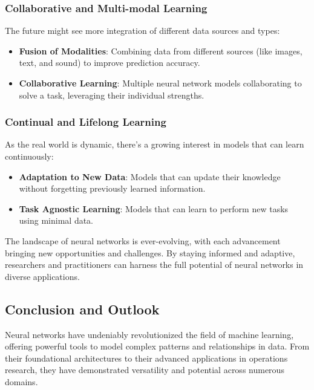 \subsubsection{Collaborative and Multi-modal Learning}

The future might see more integration of different data sources and types:

\begin{itemize}
    \item \textbf{Fusion of Modalities}: Combining data from different sources (like images, text, and sound) to improve prediction accuracy.
    \item \textbf{Collaborative Learning}: Multiple neural network models collaborating to solve a task, leveraging their individual strengths.
\end{itemize}

\subsubsection{Continual and Lifelong Learning}

As the real world is dynamic, there's a growing interest in models that can learn continuously:

\begin{itemize}
    \item \textbf{Adaptation to New Data}: Models that can update their knowledge without forgetting previously learned information.
    \item \textbf{Task Agnostic Learning}: Models that can learn to perform new tasks using minimal data.
\end{itemize}

The landscape of neural networks is ever-evolving, with each advancement bringing new opportunities and challenges. By staying informed and adaptive, researchers and practitioners can harness the full potential of neural networks in diverse applications.

\subsection{Conclusion and Outlook}

Neural networks have undeniably revolutionized the field of machine learning, offering powerful tools to model complex patterns and relationships in data. From their foundational architectures to their advanced applications in operations research, they have demonstrated versatility and potential across numerous domains.

